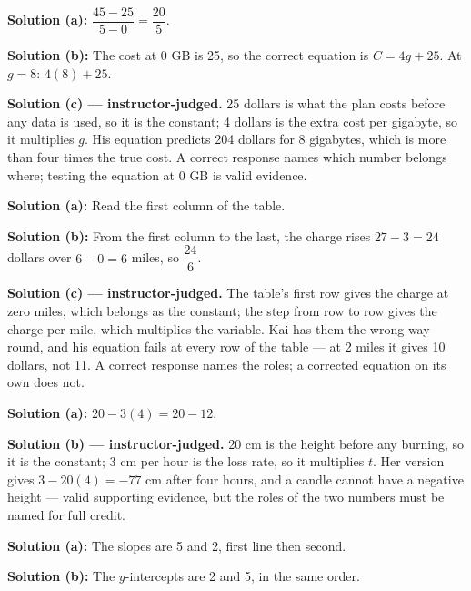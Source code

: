 \documentclass[12pt]{article}
\begin{document}
\textbf{Solution (a):} $\dfrac{45 - 25}{5 - 0} = \dfrac{20}{5}$. 

\textbf{Solution (b):} The cost at 0 GB is 25, so the correct equation is
$C = 4g + 25$. At $g = 8$: $4(8) + 25$. 

\textbf{Solution (c) --- instructor-judged.} 25 dollars is what the plan costs
before any data is used, so it is the constant; 4 dollars is the extra cost per
gigabyte, so it multiplies $g$. His equation predicts 204 dollars for 8
gigabytes, which is more than four times the true cost. A correct response
names which number belongs where; testing the equation at 0 GB is valid
evidence.


\textbf{Solution (a):} Read the first column of the table. 

\textbf{Solution (b):} From the first column to the last, the charge rises
$27 - 3 = 24$ dollars over $6 - 0 = 6$ miles, so $\dfrac{24}{6}$.

\textbf{Solution (c) --- instructor-judged.} The table's first row gives the
charge at zero miles, which belongs as the constant; the step from row to row
gives the charge per mile, which multiplies the variable. Kai has them the
wrong way round, and his equation fails at every row of the table --- at 2
miles it gives 10 dollars, not 11. A correct response names the roles; a
corrected equation on its own does not.


\textbf{Solution (a):} $20 - 3(4) = 20 - 12$. 

\textbf{Solution (b) --- instructor-judged.} 20 cm is the height before any
burning, so it is the constant; 3 cm per hour is the loss rate, so it
multiplies $t$. Her version gives $3 - 20(4) = -77$ cm after four hours, and a
candle cannot have a negative height --- valid supporting evidence, but the
roles of the two numbers must be named for full credit.


\textbf{Solution (a):} The slopes are 5 and 2, first line then second.

\textbf{Solution (b):} The $y$-intercepts are 2 and 5, in the same order.
\end{document}
